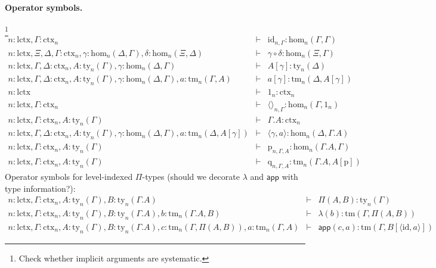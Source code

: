 \documentclass[11pt,a4paper]{article}
\theoremstyle{definition}
\newcommand{\id}{\mathsf{id}}
\newcommand{\app}[2]{{#1\,#2}} %
\def\Hom{\mathrm{hom}}
\def\id{\mathrm{id}}
\def\lctx{\mathrm{lctx}}
\newcommand{\ctx}{\mathrm{ctx}}
\newcommand{\ty}{\mathrm{ty}}
\newcommand{\tm}{\mathrm{tm}}
\newcommand{\tuple}[1]{\langle #1 \rangle}
\newcommand{\cext}{.}
\def\p{\mathrm{p}}
\def\q{\mathrm{q}}
\def\app{\mathsf{app}}
\begin{document}
\paragraph{Operator symbols.} \footnote{Check whether implicit arguments are systematic.}
\begin{eqnarray*}
n : \lctx, \Gamma : \ctx_n &\vdash& \id_{n,\Gamma} : \Hom_n(\Gamma,\Gamma)\\
n : \lctx, \Xi,\Delta,\Gamma : \ctx_n, \gamma : \Hom_n(\Delta,\Gamma), \delta : \Hom_n(\Xi,\Delta) &\vdash&
\gamma \circ \delta : \Hom_n(\Xi,\Gamma)\\
n : \lctx, \Gamma,\Delta : \ctx_n, A:\ty_n(\Gamma), \gamma : \Hom_n(\Delta,\Gamma) &\vdash&
A[\gamma] : \ty_n(\Delta)\\
n : \lctx, \Gamma,\Delta : \ctx_n, A:\ty_n(\Gamma), \gamma : \Hom_n(\Delta,\Gamma), a:\tm_n(\Gamma,A) &\vdash&  a[\gamma] : \tm_n(\Delta,A[\gamma])\\
n : \lctx &\vdash& 1_n : \ctx_n\\
n : \lctx, \Gamma : \ctx_n &\vdash& \tuple{}_{n,\Gamma} : \Hom_n(\Gamma,1_n)\\
n : \lctx, \Gamma : \ctx_n, A:\ty_n (\Gamma) &\vdash& \Gamma \cext A : \ctx_n \\
n : \lctx, \Gamma,\Delta : \ctx_n , A:\ty_n (\Gamma), \gamma : \Hom_n (\Delta,\Gamma), a:\tm_n (\Delta,A[\gamma]) &\vdash& \tuple{\gamma,a} : \Hom_n (\Delta,\Gamma\cext A)\\
n : \lctx, \Gamma : \ctx_n , A:\ty_n (\Gamma) &\vdash& \p_{n,\Gamma,A}: \Hom_n (\Gamma\cext A,\Gamma)\\
n : \lctx, \Gamma : \ctx_n , A:\ty_n (\Gamma) &\vdash& \q_{n,\Gamma,A}: \tm_n (\Gamma\cext A,A[\p])
\end{eqnarray*}
Operator symbols for level-indexed $\Pi$-types (should we decorate $\lambda$ and $\app$ with type information?):
\begin{eqnarray*}
n : \lctx, \Gamma : \ctx_n, A : \ty_n(\Gamma), B : \ty_n(\Gamma.A)&\vdash& \Pi(A,B) : \ty_n(\Gamma)\\
n : \lctx, \Gamma : \ctx_n, A : \ty_n(\Gamma), B : \ty_n(\Gamma.A), b : \tm_n(\Gamma.A, B) &\vdash& \lambda(b) : \tm(\Gamma,\Pi(A,B))\\
n : \lctx, \Gamma : \ctx_n, A : \ty_n(\Gamma), B : \ty_n(\Gamma.A), c :  \tm_n(\Gamma,\Pi(A,B)), a : \tm_n(\Gamma, A) &\vdash& \app(c,a) : \tm(\Gamma, B[\tuple{\id,a}])
\end{eqnarray*}
\end{document}
